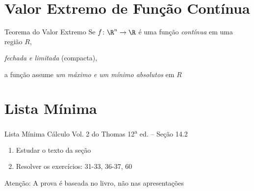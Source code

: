 \section{Valor Extremo de Função Contínua}

\begin{frame}{Teorema do Valor Extremo}
  Se \(f\colon\R^n\to\R\) é uma função \emph{contínua}
  em uma região $R$,

  \pause
  \emph{fechada e limitada} (compacta),

  \pause
  a função assume \emph{um máximo e um mínimo absolutos} em $R$
\end{frame}

\section{Lista Mínima}

\begin{frame}{Lista Mínima}
  Cálculo Vol. 2 do Thomas 12\textsuperscript{a} ed. -- Seção 14.2
  \begin{enumerate}
    \item Estudar o texto da seção
    \item Resolver os exercícios: 31-33, 36-37, 60
  \end{enumerate}

  \vfill
  Atenção: A prova é baseada no livro, não nas apresentações
\end{frame}


